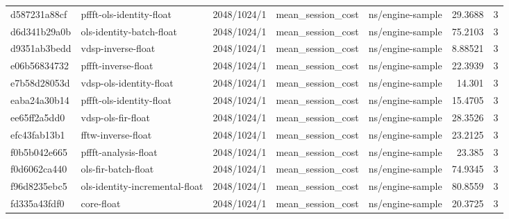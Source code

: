 \begin{longtable}{lllllrr}
d587231a88cf & pffft-ols-identity-float & 2048/1024/1 & mean\_session\_cost & ns/engine-sample & 29.3688 & 3 \\
d6d341b29a0b & ols-identity-batch-float & 2048/1024/1 & mean\_session\_cost & ns/engine-sample & 75.2103 & 3 \\
d9351ab3bedd & vdsp-inverse-float & 2048/1024/1 & mean\_session\_cost & ns/engine-sample & 8.88521 & 3 \\
e06b56834732 & pffft-inverse-float & 2048/1024/1 & mean\_session\_cost & ns/engine-sample & 22.3939 & 3 \\
e7b58d28053d & vdsp-ols-identity-float & 2048/1024/1 & mean\_session\_cost & ns/engine-sample & 14.301 & 3 \\
eaba24a30b14 & pffft-ols-identity-float & 2048/1024/1 & mean\_session\_cost & ns/engine-sample & 15.4705 & 3 \\
ee65ff2a5dd0 & vdsp-ols-fir-float & 2048/1024/1 & mean\_session\_cost & ns/engine-sample & 28.3526 & 3 \\
efc43fab13b1 & fftw-inverse-float & 2048/1024/1 & mean\_session\_cost & ns/engine-sample & 23.2125 & 3 \\
f0b5b042e665 & pffft-analysis-float & 2048/1024/1 & mean\_session\_cost & ns/engine-sample & 23.385 & 3 \\
f0d6062ca440 & ols-fir-batch-float & 2048/1024/1 & mean\_session\_cost & ns/engine-sample & 74.9345 & 3 \\
f96d8235ebc5 & ols-identity-incremental-float & 2048/1024/1 & mean\_session\_cost & ns/engine-sample & 80.8559 & 3 \\
fd335a43fdf0 & core-float & 2048/1024/1 & mean\_session\_cost & ns/engine-sample & 20.3725 & 3 \\
\end{longtable}
\endgroup
